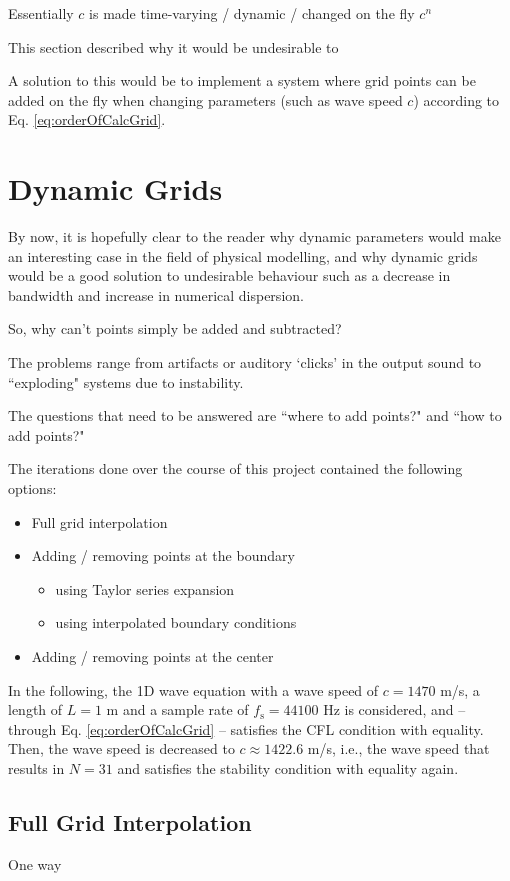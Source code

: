\documentclass[dvipsnames, preprint]{JASA}
\begin{document}
Essentially $c$ is made time-varying / dynamic / changed on the fly $c^n$



This section described why it would be undesirable to 

A solution to this would be to implement a system where grid points can be added on the fly when changing parameters (such as wave speed $c$) according to Eq. \eqref{eq:orderOfCalcGrid}.

\section{Dynamic Grids}
By now, it is hopefully clear to the reader why dynamic parameters would make an interesting case in the field of physical modelling, and why dynamic grids would be a good solution to undesirable behaviour such as a decrease in bandwidth and increase in numerical dispersion. 

So, why can't points simply be added and subtracted? 

The problems range from artifacts or auditory `clicks' in the output sound to ``exploding" systems due to instability.

The questions that need to be answered are ``where to add points?" and ``how to add points?"

The iterations done over the course of this project contained the following options:
\begin{itemize}
    \item Full grid interpolation
    \item Adding / removing points at the boundary
    \begin{itemize}
        \item using Taylor series expansion
        \item using interpolated boundary conditions
    \end{itemize}
    \item Adding / removing points at the center
\end{itemize}
In the following, the 1D wave equation with a wave speed of $c = 1470$ m/s, a length of $L = 1$ m and a sample rate of $f_\text{s} = 44100$ Hz is considered, and -- through Eq. \eqref{eq:orderOfCalcGrid} -- satisfies the CFL condition with equality. Then, the wave speed is decreased to $c \approx 1422.6$ m/s, i.e., the wave speed that results in $N=31$ and satisfies the stability condition with equality again. 

\subsection{Full Grid Interpolation}
One way 

\end{document}
